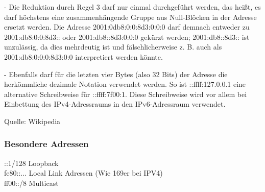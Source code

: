 - Die Reduktion durch Regel 3 darf nur einmal durchgeführt werden, das heißt, es darf höchstens eine zusammenhängende Gruppe aus Null-Blöcken in der Adresse ersetzt werden. Die Adresse 2001:0db8:0:0:8d3:0:0:0 darf demnach entweder zu 2001:db8:0:0:8d3:: oder 2001:db8::8d3:0:0:0 gekürzt werden; 2001:db8::8d3:: ist unzulässig, da dies mehrdeutig ist und fälschlicherweise z. B. auch als 2001:db8:0:0:0:8d3:0:0 interpretiert werden könnte.

- Ebenfalls darf für die letzten vier Bytes (also 32 Bits) der Adresse die herkömmliche dezimale Notation verwendet werden. So ist ::ffff:127.0.0.1 eine alternative Schreibweise für ::ffff:7f00:1. Diese Schreibweise wird vor allem bei Einbettung des IPv4-Adressraums in den IPv6-Adressraum verwendet.

Quelle: Wikipedia

\subsubsection{Besondere Adressen}
::1/128 Loopback\\
fe80::... Local Link Adressen (Wie 169er bei IPV4)\\
ff00::/8 Multicast

